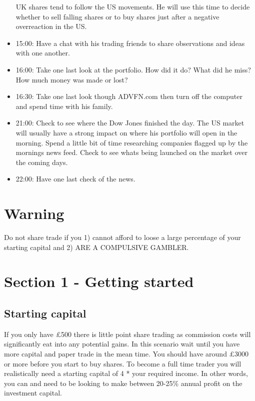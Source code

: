 \begin{itemize}
UK shares tend to follow the US movements.
He will use this time to decide whether to sell falling shares or to buy shares just after a negative overreaction in the US.
\item 15:00: Have a chat with his trading friends to share observations and ideas with one another.
\item 16:00: Take one last look at the portfolio.
How did it do?
What did he miss?
How much money was made or lost?
\item 16:30: Take one last look though ADVFN.com then turn off the computer and spend time with his family.
\item 21:00: Check to see where the Dow Jones finished the day.
The US market will usually have a strong impact on where his portfolio will open in the morning.
Spend a little bit of time researching companies flagged up by the mornings news feed.
Check to see whats being launched on the market over the coming days.
\item 22:00: Have one last check of the news.
\end{itemize}

\section*{Warning}
Do not share trade if you 1) cannot afford to loose a large percentage of your starting capital and 2) ARE A COMPULSIVE GAMBLER.

\section*{Section 1 - Getting started}


\subsection*{Starting capital}
If you only have \pounds 500 there is little point share trading as commission costs will significantly eat into any potential gains.
In this scenario wait until you have more capital and paper trade in the mean time.
You should have around \pounds 3000 or more before you start to buy shares.
To become a full time trader you will realistically need a starting capital of 4 * your required income.
In other words, you can and need to be looking to make between 20-25\% annual profit on the investment capital.
